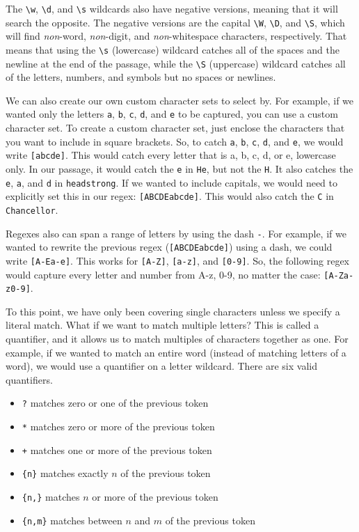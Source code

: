 The \verb|\w|, \verb|\d|, and \verb|\s| wildcards also have negative versions, meaning that it will search the opposite. The negative versions are the capital \verb|\W|, \verb|\D|, and \verb|\S|, which will find \textit{non}-word, \textit{non}-digit, and \textit{non}-whitespace characters, respectively. That means that using the \verb|\s| (lowercase) wildcard catches all of the spaces and the newline at the end of the passage, while the \verb|\S| (uppercase) wildcard catches all of the letters, numbers, and symbols but no spaces or newlines.\par
We can also create our own custom character sets to select by. For example, if we wanted only the letters \verb|a|, \verb|b|, \verb|c|, \verb|d|, and \verb|e| to be captured, you can use a custom character set. To create a custom character set, just enclose the characters that you want to include in square brackets. So, to catch \verb|a|, \verb|b|, \verb|c|, \verb|d|, and \verb|e|, we would write \verb|[abcde]|. This would catch every letter that is a, b, c, d, or e, lowercase only. In our passage, it would catch the \verb|e| in \verb|He|, but not the \verb|H|. It also catches the \verb|e|, \verb|a|, and \verb|d| in \verb|headstrong|. If we wanted to include capitals, we would need to explicitly set this in our regex: \verb|[ABCDEabcde]|. This would also catch the \verb|C| in \verb|Chancellor|.\par
Regexes also can span a range of letters by using the dash \verb|-|. For example, if we wanted to rewrite the previous regex (\verb|[ABCDEabcde]|) using a dash, we could write \verb|[A-Ea-e]|. This works for \verb|[A-Z]|, \verb|[a-z]|, and \verb|[0-9]|. So, the following regex would capture every letter and number from A-z, 0-9, no matter the case: \verb|[A-Za-z0-9]|.\par
To this point, we have only been covering single characters unless we specify a literal match. What if we want to match multiple letters? This is called a quantifier, and it allows us to match multiples of characters together as one. For example, if we wanted to match an entire word (instead of matching letters of a word), we would use a quantifier on a letter wildcard. There are six valid quantifiers.
\begin{itemize}
\item \verb|?| matches zero or one of the previous token
\item \verb|*| matches zero or more of the previous token
\item \verb|+| matches one or more of the previous token
\item \verb|{n}| matches exactly $n$ of the previous token
\item \verb|{n,}| matches $n$ or more of the previous token
\item \verb|{n,m}| matches between $n$ and $m$ of the previous token
\end{itemize}
